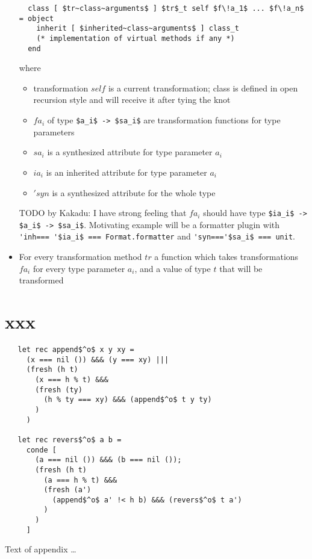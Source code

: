 \documentclass[acmsmall,review,anonymous]{acmart}\settopmatter{printfolios=true,printccs=false,printacmref=false}
\begin{document}
\begin{itemize}
  \begin{lstlisting}
  class [ $tr~class~arguments$ ] $tr$_t self $f\!a_1$ ... $f\!a_n$ = object
    inherit [ $inherited~class~arguments$ ] class_t
    (* implementation of virtual methods if any *)
  end
  \end{lstlisting}
  where \begin{itemize}
          \item transformation $self$ is a current transformation; class is defined in open recursion style and will receive it after tying the knot
          \item $f\!a_i$ of type \lstinline{$a_i$ -> $sa_i$} are transformation functions for type parameters
          \item $sa_i$ is a synthesized attribute for type parameter $a_i$
          \item $ia_i$ is an inherited attribute for type parameter $a_i$
          \item $'syn$ is a synthesized attribute for the whole type
  \end{itemize}
\bigskip
  TODO by Kakadu: I have strong feeling that $fa_i$ should have type \lstinline{$ia_i$ -> $a_i$ -> $sa_i$}. Motivating example will be a formatter plugin with \lstinline{'inh=== '$ia_i$ === Format.formatter} and \lstinline{'syn==='$sa_i$ === unit}.
  \item For every transformation method $tr$ a function which takes transformations $f\!a_i$ for every type parameter $a_i$, and a value of type $t$ that will be transformed
\end{itemize}

\section{xxx}
\begin{lstlisting}
   let rec append$^o$ x y xy =
     (x === nil ()) &&& (y === xy) |||
     (fresh (h t)
       (x === h % t) &&&
       (fresh (ty)
         (h % ty === xy) &&& (append$^o$ t y ty)
       )
     )

   let rec revers$^o$ a b =
     conde [
       (a === nil ()) &&& (b === nil ());
       (fresh (h t)
         (a === h % t) &&&
         (fresh (a')
           (append$^o$ a' !< h b) &&& (revers$^o$ t a')
         )
       )
     ]
\end{lstlisting}


Text of appendix \ldots
\end{document}
